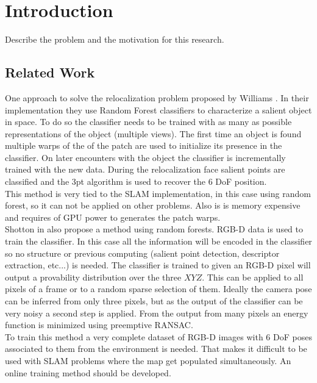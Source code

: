 \chapter{Introduction}\label{sec:introduction}

Describe the problem and the motivation for this research.

\section{Related Work}\label{sec:related_work}

One approach to solve the relocalization problem proposed by Williams \cite{Williams2007}. In their implementation they use Random Forest classifiers to characterize a salient object in space. To do so the classifier needs to be trained with as many as possible representations of the object (multiple views). The first time an object is found multiple warps of the of the patch are used to initialize its presence in the classifier. On later encounters with the object the classifier is incrementally trained with the new data. During the relocalization face salient points are classified and the 3pt algorithm is used to recover the 6 DoF position.\\

This method is very tied to the SLAM implementation, in this case using random forest, so it can not be applied on other problems. Also is is memory expensive and requires of GPU power to generates the patch warps.\\

Shotton in \cite{Shotton2013} also propose a method using random forests. RGB-D data is used to train the classifier. In this case all the information will be encoded in the classifier so no structure or previous computing (salient point detection, descriptor extraction, etc...) is needed. The classifier is trained to given an RGB-D pixel will output a provability distribution over the three $XYZ$. This can be applied to all pixels of a frame or to a random sparse selection of them. Ideally the camera pose can be inferred from only three pixels, but as the output of the classifier can be very noisy a second step is applied. From the output from many pixels an energy function is minimized using preemptive RANSAC.\\

To train this method a very complete dataset of RGB-D images with 6 DoF poses associated to them from the environment is needed. That makes it difficult to be used with SLAM problems where the map get populated simultaneously. An online training  method should be developed.\\

